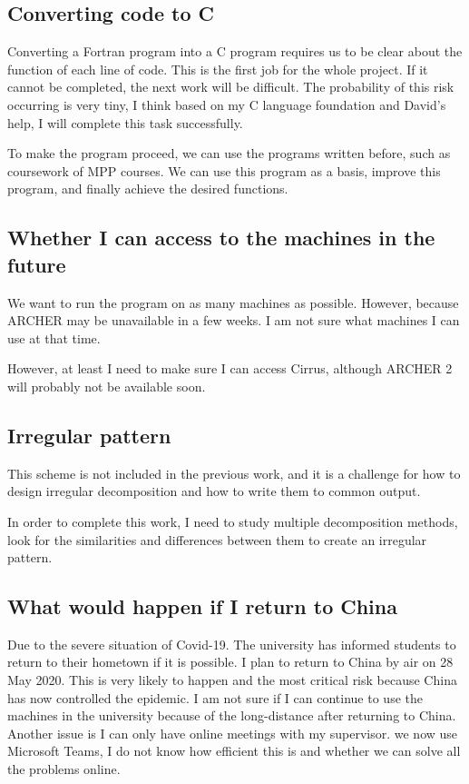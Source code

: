 \documentclass{article}
\begin{document}
\subsection{Converting code to C}
Converting a Fortran program into a C program requires us to be clear about the function of each line of code. This is the first job for the whole project. If it cannot be completed, the next work will be difficult. The probability of this risk occurring is very tiny, I think based on my C language foundation and David's help, I will complete this task successfully.

To make the program proceed, we can use the programs written before, such as coursework of MPP courses. We can use this program as a basis, improve this program, and finally achieve the desired functions.
\subsection{Whether I can access to the machines in the future}
We want to run the program on as many machines as possible. However, because ARCHER may be unavailable in a few weeks. I am not sure what machines I can use at that time.

However, at least I need to make sure I can access Cirrus, although ARCHER 2 will probably not be available soon.
\subsection{Irregular pattern}
This scheme is not included in the previous work, and it is a challenge for how to design irregular decomposition and how to write them to common output.

In order to complete this work, I need to study multiple decomposition methods, look for the similarities and differences between them to create an irregular pattern.
\subsection{What would happen if I return to China}
Due to the severe situation of Covid-19. The university has informed students to return to their hometown if it is possible. I plan to return to China by air on 28 May 2020. This is very likely to happen and the most critical risk because China has now controlled the epidemic. I am not sure if I can continue to use the machines in the university because of the long-distance after returning to China. Another issue is I can only have online meetings with my supervisor. we now use Microsoft Teams, I do not know how efficient this is and whether we can solve all the problems online.
\end{document}
